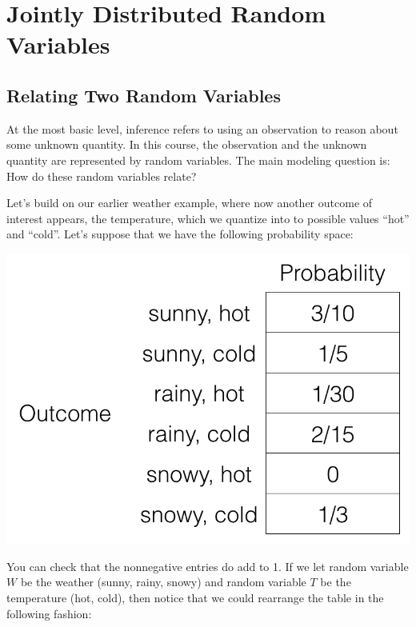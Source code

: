 \documentclass[6008notes.tex]{subfiles}
\begin{document}
\graphicspath{ {images/jointdist/} }

\section{Jointly Distributed Random Variables}

\subsection{Relating Two Random Variables}

At the most basic level, inference refers to using an observation to reason about some unknown quantity. In this course, the observation and the unknown quantity are represented by random variables. The main modeling question is: How do these random variables relate?

Let's build on our earlier weather example, where now another outcome of interest appears, the temperature, which we quantize into to possible values ``hot'' and ``cold''. Let's suppose that we have the following probability space:

{\centering\includegraphics[scale=0.4]{images_sec-joint-rv-prob-space} \par}

You can check that the nonnegative entries do add to 1. If we let random variable $W$ be the weather (sunny, rainy, snowy) and random variable $T$ be the temperature (hot, cold), then notice that we could rearrange the table in the following fashion:
\end{document}
